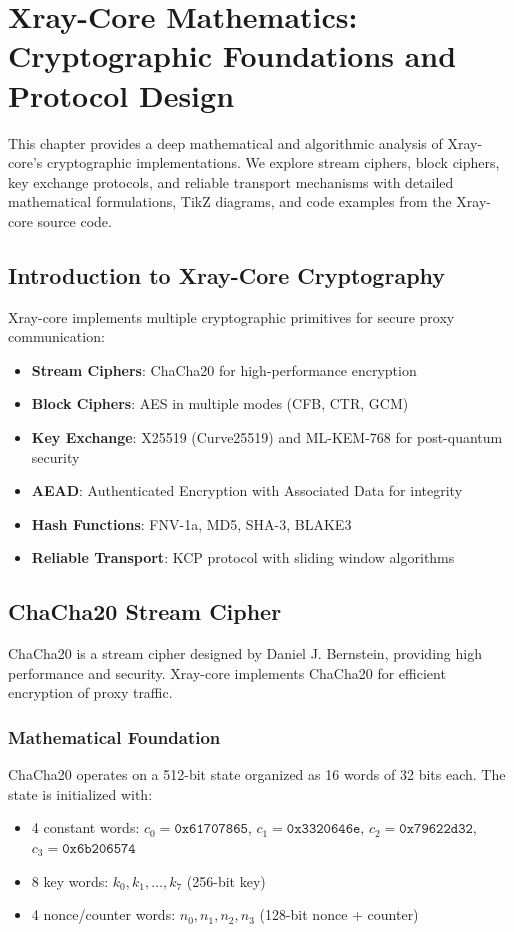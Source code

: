\chapter{Xray-Core Mathematics: Cryptographic Foundations and Protocol Design}

This chapter provides a deep mathematical and algorithmic analysis of Xray-core's cryptographic implementations. We explore stream ciphers, block ciphers, key exchange protocols, and reliable transport mechanisms with detailed mathematical formulations, TikZ diagrams, and code examples from the Xray-core source code.

\section{Introduction to Xray-Core Cryptography}

Xray-core implements multiple cryptographic primitives for secure proxy communication:
\begin{itemize}
    \item \textbf{Stream Ciphers}: ChaCha20 for high-performance encryption
    \item \textbf{Block Ciphers}: AES in multiple modes (CFB, CTR, GCM)
    \item \textbf{Key Exchange}: X25519 (Curve25519) and ML-KEM-768 for post-quantum security
    \item \textbf{AEAD}: Authenticated Encryption with Associated Data for integrity
    \item \textbf{Hash Functions}: FNV-1a, MD5, SHA-3, BLAKE3
    \item \textbf{Reliable Transport}: KCP protocol with sliding window algorithms
\end{itemize}

\section{ChaCha20 Stream Cipher}

ChaCha20 is a stream cipher designed by Daniel J. Bernstein, providing high performance and security. Xray-core implements ChaCha20 for efficient encryption of proxy traffic.

\subsection{Mathematical Foundation}

ChaCha20 operates on a 512-bit state organized as 16 words of 32 bits each. The state is initialized with:
\begin{itemize}
    \item 4 constant words: $c_0 = \texttt{0x61707865}$, $c_1 = \texttt{0x3320646e}$, $c_2 = \texttt{0x79622d32}$, $c_3 = \texttt{0x6b206574}$
    \item 8 key words: $k_0, k_1, \ldots, k_7$ (256-bit key)
    \item 4 nonce/counter words: $n_0, n_1, n_2, n_3$ (128-bit nonce + counter)
\end{itemize}

